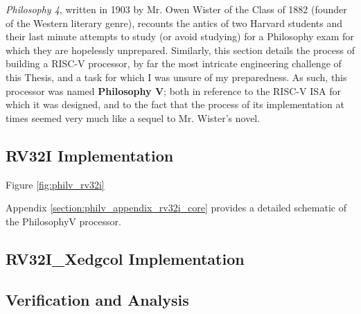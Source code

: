 \textit{Philosophy 4}, written in 1903 by Mr. Owen Wister of the Class of 1882 (founder of the Western literary genre), recounts the antics of two Harvard students and their last minute attempts to study (or avoid studying) for a Philosophy exam for which they are hopelessly unprepared. Similarly, this section details the process of building a RISC-V processor, by far the most intricate engineering challenge of this Thesis, and a task for which I was unsure of my preparedness. As such, this processor was named \textbf{Philosophy V}; both in reference to the RISC-V ISA for which it was designed, and to the fact that the process of its implementation at times seemed very much like a sequel to Mr. Wister's novel.
    

    \subsection{RV32I Implementation}
        Figure \ref{fig:philv_rv32i} 

        

        Appendix \ref{section:philv_appendix_rv32i_core} provides a detailed schematic of the PhilosophyV processor.
        

    \subsection{RV32I\_Xedgcol Implementation}

    \subsection{Verification and Analysis}
